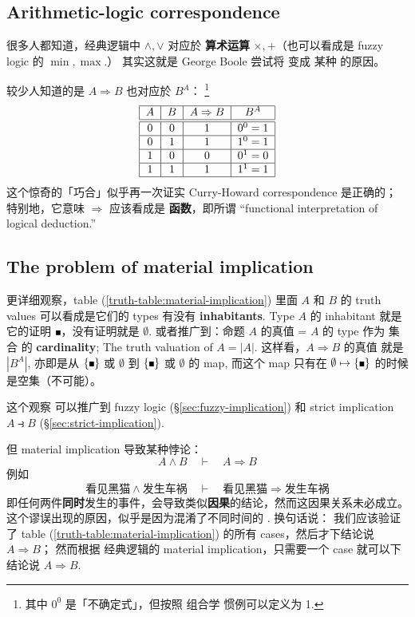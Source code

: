 \subsection{Arithmetic-logic correspondence}

很多人都知道，经典逻辑中 $\wedge, \vee$ 对应於 \textbf{算术运算} $\times, +$（也可以看成是 fuzzy logic 的 $\min, \max$.） 其实这就是 George Boole 尝试将  变成 某种 的原因。

较少人知道的是 $A \Rightarrow B$ 也对应於 $B^A$： \footnote{其中 $0^0$ 是「不确定式」，但按照 组合学 惯例可以定义为 1.}
\begin{equation}
\label{truth-table:material-implication}
\begin{tabular}{|c|c|c|c|}
	\hline 
	$A$ & $B$ & $A \Rightarrow B$ & $B^A$ \\ 
	\hline \hline 
	0 & 0 & 1 & $0^0 = 1$ \\
	\hline 
	0 & 1 & 1 & $1^0 = 1$ \\ 
	\hline 
	1 & 0 & 0 & $0^1 = 0$ \\ 
	\hline 
	1 & 1 & 1 & $1^1 = 1$ \\ 
	\hline 
\end{tabular} 
\end{equation}
这个惊奇的「巧合」似乎再一次证实 Curry-Howard correspondence 是正确的； 特别地，它意味 $\Rightarrow$ 应该看成是 \textbf{函数}，即所谓 ``functional interpretation of logical deduction.'' 

\subsection{The problem of material implication}
\label{sec:material-implication}

更详细观察，table (\ref{truth-table:material-implication}) 里面 $A$ 和 $B$ 的 truth values 可以看成是它们的 types 有没有 \textbf{inhabitants}. Type $A$ 的 inhabitant 就是它的证明 $\witness$，没有证明就是 $\emptyset$.  或者推广到：命题 $A$ 的真值 = $A$ 的 type 作为 集合 的 \textbf{cardinality}; The truth valuation of $A = |A|$.  这样看，$A \Rightarrow B$ 的真值 就是 $|B^A|$, 亦即是从 $\{\witness\}$ 或 $\emptyset$ 到 $\{\witness\}$ 或 $\emptyset$ 的 map, 而这个 map 只有在 $\emptyset \mapsto \{\witness\}$ 的时候是空集（不可能）。

这个观察 可以推广到 fuzzy logic (\S\ref{sec:fuzzy-implication}) 和 strict implication $A \strictif B$ (\S\ref{sec:strict-implication}).

但 material implication 导致某种悖论：
\begin{equation}
A \wedge B \quad \vdash \quad A \Rightarrow B
\end{equation}
例如
\begin{equation}
\mbox{看见黑猫} \wedge \mbox{发生车祸} \quad \vdash \quad \mbox{看见黑猫} \Rightarrow \mbox{发生车祸}
\end{equation}
即任何两件\textbf{同时}发生的事件，会导致类似\textbf{因果}的结论，然而这因果关系未必成立。 这个谬误出现的原因，似乎是因为混淆了不同时间的 .  换句话说： 我们应该验证了 table (\ref{truth-table:material-implication}) 的所有 cases，然后才下结论说 $A \Rightarrow B$； 然而根据 经典逻辑的 material implication，只需要一个 case 就可以下结论说 $A \Rightarrow B$.

